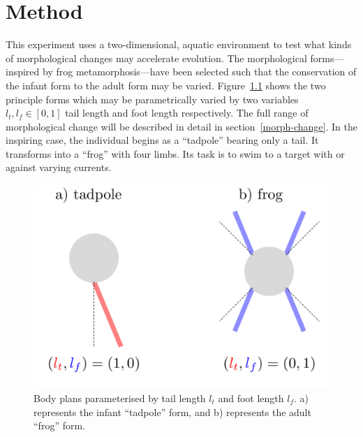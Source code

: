 \chapter{Method}

This experiment uses a two-dimensional, aquatic environment to test
what kinds of morphological changes may accelerate evolution. The
morphological forms---inspired by frog metamorphosis---have been
selected such that the conservation of the infant form to the adult
form may be varied. Figure~\ref{morphology} shows the two principle
forms which may be parametrically varied by two variables $l_t, l_f
\in [0, 1]$ tail length and foot length respectively.  The full range
of morphological change will be described in detail in
section~\ref{morph-change}.  In the inspiring case, the individual
begins as a ``tadpole'' bearing only a tail. It transforms into a
``frog'' with four limbs. Its task is to swim to a target with or
against varying currents.

\begin{figure}[h]
  \centering
  \includegraphics[scale=0.4]{fig/forms.pdf} 
  \vspace{-30pt}
  \caption[Body plans]{\label{morphology}Body plans parameterised by
    tail length $l_t$ and foot length $l_f$. a) represents the infant
    ``tadpole'' form, and b) represents the adult ``frog'' form. }
\end{figure}

